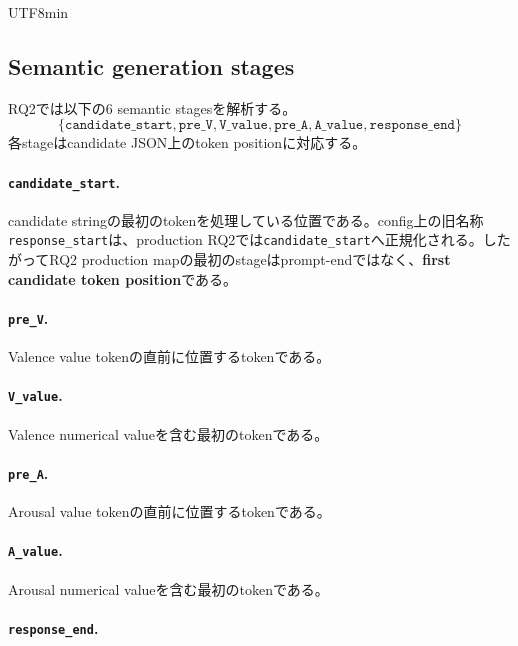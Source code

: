 \documentclass{article} %
\begin{document}
\begin{CJK*}{UTF8}{min}
\subsection{Semantic generation stages}

RQ2では以下の6 semantic stagesを解析する。
\[
\{
\texttt{candidate\_start},
\texttt{pre\_V},
\texttt{V\_value},
\texttt{pre\_A},
\texttt{A\_value},
\texttt{response\_end}
\}
\]
各stageはcandidate JSON上のtoken positionに対応する。


\paragraph{\texttt{candidate\_start}.}

candidate stringの最初のtokenを処理している位置である。config上の旧名称\texttt{response\_start}は、production RQ2では\texttt{candidate\_start}へ正規化される。したがってRQ2 production mapの最初のstageはprompt-endではなく、\textbf{first candidate token position}である。


\paragraph{\texttt{pre\_V}.}

Valence value tokenの直前に位置するtokenである。


\paragraph{\texttt{V\_value}.}

Valence numerical valueを含む最初のtokenである。


\paragraph{\texttt{pre\_A}.}

Arousal value tokenの直前に位置するtokenである。


\paragraph{\texttt{A\_value}.}

Arousal numerical valueを含む最初のtokenである。


\paragraph{\texttt{response\_end}.}


\end{CJK*}
\end{document}
